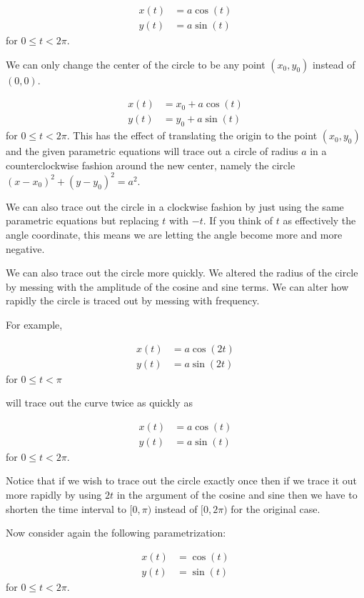 \documentclass{ximera}
\begin{document}
\begin{exercise}
\begin{exercise}
\begin{align*}
x(t)&=a\cos(t)\\
y(t)&=a\sin(t)
\end{align*}
for $0 \leq t < 2\pi$. 

We can only change the center of the circle to be any point $(x_{0}, y_{0})$ instead of $(0,0)$. 

\begin{align*}
x(t)&=x_{0} + a\cos(t)\\
y(t)&=y_{0}+ a\sin(t)
\end{align*}
for $0 \leq t < 2\pi$. 
This has the effect of translating the origin to the point $(x_{0}, y_{0})$ and the given parametric equations will trace out a circle of radius $a$ in a 
counterclockwise fashion around the new center, namely the circle $(x-x_{0})^2+(y-y_{0})^2=a^2$. 

We can also trace out the circle in a clockwise fashion by just using the same parametric equations but replacing $t$ with $-t$. If  you think of $t$ as effectively the angle coordinate, this means we are letting the angle become more and more negative.

We can also trace out the circle more quickly. We altered the radius of the circle by messing with the amplitude of the cosine and sine terms. We can alter how 
rapidly the circle is traced out by messing with frequency. 

For example, 

\begin{align*}
x(t)&=a\cos(2t)\\
y(t)&=a\sin(2t)
\end{align*}
for $0\leq t <\pi$

will trace out the curve twice as quickly as 

\begin{align*}
x(t)&=a\cos(t)\\
y(t)&=a\sin(t)
\end{align*}
for $0 \leq t < 2\pi$. 


Notice that if we wish to trace out the circle exactly once then if we trace it out more rapidly by using $2t$ in the argument of the cosine and sine then we have to shorten the time interval to $[0, \pi)$ instead of $[0, 2\pi)$ for the original case. 



Now consider again the following parametrization:

\begin{align*}
x(t)&=\cos(t)\\
y(t)&=\sin(t)
\end{align*}
for $0 \leq t < 2\pi$. 


\end{exercise}
\end{exercise}
\end{document}
